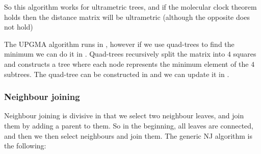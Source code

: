     So this algorithm works for ultrametric trees, and if the molecular clock 
    theorem holds then the distance matrix will be ultrametric (although the 
    opposite does not hold)
    
    The UPGMA algorithm runs in , however if we use quad-trees to 
    find the minimum we can do it in . Quad-trees recursively split 
    the matrix into $4$ squares and constructs a tree where each node 
    represents the minimum element of the $4$ subtrees. The quad-tree can be 
    constructed in  and we can update it in .
    
    \subsubsection{Neighbour joining}
    Neighbour joining is divisive in that we select two neighbour leaves, and 
    join them by adding a parent to them. So in the beginning, all leaves are 
    connected, and then we then select neighbours and join them. The generic NJ 
    algorithm is the following:
    
